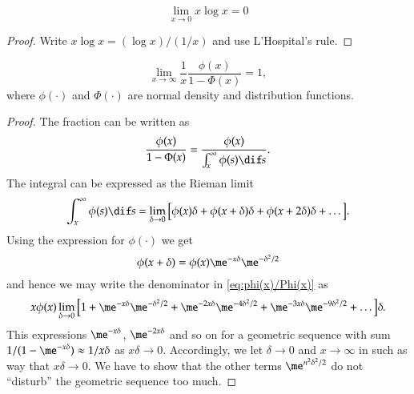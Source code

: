 \documentclass[a4paper]{article}
\numberwithin{equation}{subsection}
\begin{document}
\begin{equation}
  \lim_{x\to 0} x \log x = 0
\end{equation}
\begin{proof}
  Write $x \log x = (\log x)/(1/x)$ and use L'Hospital's rule.
\end{proof}

\begin{equation}
  \label{eq:phi(x)/Phi(x)}
  \lim_{x\to \infty}
  \frac{1}{x} \frac{\phi(x)}{1 - \Phi(x)} = 1,
\end{equation}
where $\phi(\cdot)$ and $\Phi(\cdot)$ are normal density and
distribution functions.

\begin{proof}
  The fraction can be written as
  \begin{equation*}
    \frac{\phi(x)}{1 - \Phi(x)}
    =
    \frac{\phi(x)}{\int_{x}^{\infty} \phi(s) \dif s}.
  \end{equation*}
  The integral can be expressed as the Rieman limit
  \begin{equation*}
    \int_{x}^{\infty} \phi(s) \dif s
    =
    \lim_{\delta \to 0} 
    \big[
    \phi(x) \delta +
    \phi(x + \delta) \delta +
    \phi(x + 2 \delta) \delta +
    \dots 
    \big].
  \end{equation*}
  Using the expression for $\phi(\cdot)$ we get
  \begin{equation*}
    \phi(x + \delta) = \phi(x) \me^{-x \delta} \me^{-\delta^{2}/2}
  \end{equation*}
  and hence we may write the denominator in \eqref{eq:phi(x)/Phi(x)}
  as
  \begin{equation*}
    x \phi(x)
    \lim_{\delta \to 0} 
    \big[
    1 +
    \me^{-x \delta} \me^{-\delta^{2}/2} +
    \me^{-2 x \delta} \me^{-4 \delta^{2}/2} +
    \me^{-3 x \delta} \me^{-9 \delta^{2}/2} +
    \dots 
    \big] \delta.
  \end{equation*}
  This expressions $\me^{-x \delta}$, $\me^{-2 x \delta}$ and so on
  for a geometric sequence with sum $1/(1 - \me^{-x \delta}) \approx 1/x
  \delta$ as $x \delta \to 0$.  Accordingly, we let $\delta \to 0$ and $x
  \to \infty$ in such as way that $x \delta \to 0$.  We have to show
  that the other terms $\me^{n^{2} \delta^{2}/2}$ do not ``disturb''
  the geometric sequence too much.


\end{proof}
\end{document}
